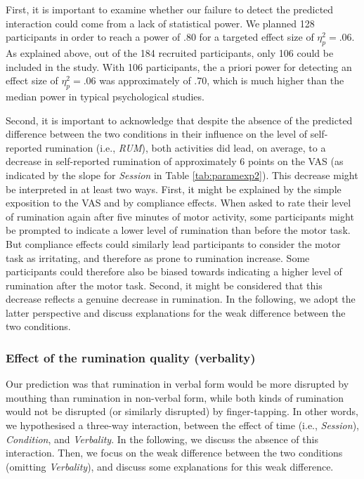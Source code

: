 \documentclass[a4paper,12pt,twoside,openright,oldfontcommands,final]{memoir}
\begin{document}
First, it is important to examine whether our failure to detect the predicted interaction could come from a lack of statistical power. We planned 128 participants in order to reach a power of .80 for a targeted effect size of \(\eta_{p}^{2}=.06\). As explained above, out of the 184 recruited participants, only 106 could be included in the study. With 106 participants, the a priori power for detecting an effect size of \(\eta_{p}^{2}=.06\) was approximately of .70, which is much higher than the median power in typical psychological studies.

Second, it is important to acknowledge that despite the absence of the predicted difference between the two conditions in their influence on the level of self-reported rumination (i.e., \emph{RUM}), both activities did lead, on average, to a decrease in self-reported rumination of approximately 6 points on the VAS (as indicated by the slope for \emph{Session} in Table \ref{tab:paramexp2}). This decrease might be interpreted in at least two ways. First, it might be explained by the simple exposition to the VAS and by compliance effects. When asked to rate their level of rumination again after five minutes of motor activity, some participants might be prompted to indicate a lower level of rumination than before the motor task. But compliance effects could similarly lead participants to consider the motor task as irritating, and therefore as prone to rumination increase. Some participants could therefore also be biased towards indicating a higher level of rumination after the motor task. Second, it might be considered that this decrease reflects a genuine decrease in rumination. In the following, we adopt the latter perspective and discuss explanations for the weak difference between the two conditions.

\hypertarget{effect-of-the-rumination-quality-verbality}{%
\subsubsection{Effect of the rumination quality (verbality)}\label{effect-of-the-rumination-quality-verbality}}

Our prediction was that rumination in verbal form would be more disrupted by mouthing than rumination in non-verbal form, while both kinds of rumination would not be disrupted (or similarly disrupted) by finger-tapping. In other words, we hypothesised a three-way interaction, between the effect of time (i.e., \emph{Session}), \emph{Condition}, and \emph{Verbality}. In the following, we discuss the absence of this interaction. Then, we focus on the weak difference between the two conditions (omitting \emph{Verbality}), and discuss some explanations for this weak difference.
\end{document}
